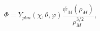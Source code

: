 \begin{equation}\label{an}\Phi=Y_{plm}(\chi,\theta,\varphi)\frac{\psi_{M}(\rho_{M})}{\rho_{M}^{3/2}},\end{equation} 
